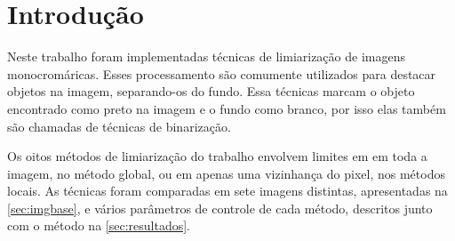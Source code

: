 \section{Introdução} \label{sec:intro}

Neste trabalho foram implementadas técnicas de limiarização de imagens monocromáricas. Esses processamento são comumente utilizados para destacar objetos na imagem, separando-os do fundo. Essa técnicas marcam o objeto encontrado como preto na imagem e o fundo como branco, por isso elas também são chamadas de técnicas de binarização.

Os oitos métodos de limiarização do trabalho envolvem limites em em toda a imagem, no método global, ou em apenas uma vizinhança do pixel, nos métodos locais. As técnicas foram comparadas em sete imagens distintas, apresentadas na \cref{sec:imgbase}, e vários parâmetros de controle de cada método, descritos junto com o método na \cref{sec:resultados}.
